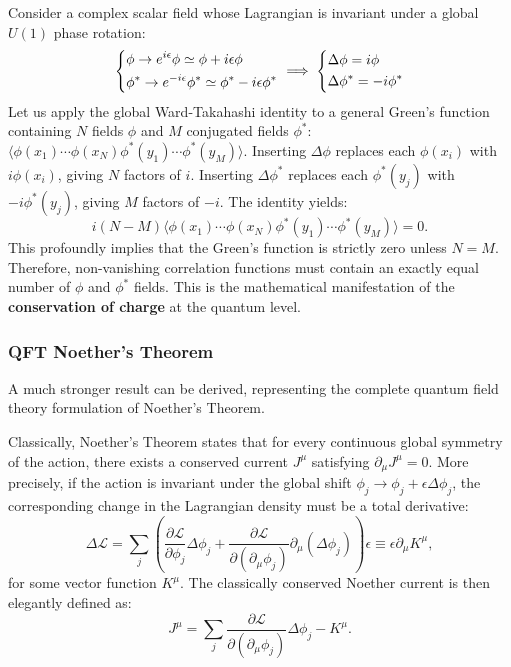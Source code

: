 \begin{example}
    Consider a complex scalar field whose Lagrangian is invariant under a global $U(1)$ phase rotation:
    \[
        \begin{dcases}
            \phi \to e^{i\epsilon}\phi \simeq \phi + i\epsilon\phi \\
            \phi^* \to e^{-i\epsilon}\phi^* \simeq \phi^* - i\epsilon\phi^*
        \end{dcases}
        \implies
        \begin{dcases}
            \Delta\phi = i\phi \\
            \Delta\phi^* = -i\phi^*
        \end{dcases}
    \]
    Let us apply the global Ward-Takahashi identity to a general Green's function containing $N$ fields $\phi$ and $M$ conjugated fields $\phi^*$: $\langle \phi(x_1) \cdots \phi(x_N) \phi^*(y_1) \cdots \phi^*(y_M) \rangle$.
    Inserting $\Delta\phi$ replaces each $\phi(x_i)$ with $i\phi(x_i)$, giving $N$ factors of $i$. Inserting $\Delta\phi^*$ replaces each $\phi^*(y_j)$ with $-i\phi^*(y_j)$, giving $M$ factors of $-i$. The identity yields:
    \[
        i(N - M) \langle \phi(x_1) \cdots \phi(x_N) \phi^*(y_1) \cdots \phi^*(y_M) \rangle = 0.
    \]
    This profoundly implies that the Green's function is strictly zero unless $N = M$. Therefore, non-vanishing correlation functions must contain an exactly equal number of $\phi$ and $\phi^*$ fields. This is the mathematical manifestation of the \textbf{conservation of charge} at the quantum level.
\end{example}

\subsubsection{QFT Noether's Theorem}

A much stronger result can be derived, representing the complete quantum field theory formulation of Noether's Theorem.

Classically, Noether's Theorem states that for every continuous global symmetry of the action, there exists a conserved current $J^\mu$ satisfying $\partial_\mu J^\mu = 0$. More precisely, if the action is invariant under the global shift $\phi_j \to \phi_j + \epsilon \Delta\phi_j$, the corresponding change in the Lagrangian density must be a total derivative:
\[
    \Delta\mathcal{L} = \sum_j \left( \frac{\partial \mathcal{L}}{\partial \phi_j} \Delta\phi_j + \frac{\partial \mathcal{L}}{\partial (\partial_\mu \phi_j)} \partial_\mu(\Delta\phi_j) \right) \epsilon \equiv \epsilon \partial_\mu K^\mu,
\]
for some vector function $K^\mu$. The classically conserved Noether current is then elegantly defined as:
\[
    J^\mu = \sum_j \frac{\partial \mathcal{L}}{\partial (\partial_\mu \phi_j)} \Delta\phi_j - K^\mu.
\]

